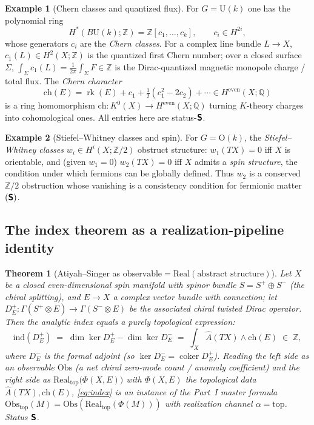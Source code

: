 \documentclass[12pt]{article}
\newtheorem{theorem}{Theorem}[section]
\theoremstyle{definition}
\newtheorem{example}[example]{Example}
\theoremstyle{remark}
\newcommand{\Real}{\mathrm{Real}}
\newcommand{\Obs}{\mathrm{Obs}}
\newcommand{\ind}{\mathrm{ind}}
\newcommand{\ch}{\mathrm{ch}}
\newcommand{\Ahat}{\widehat{A}}
\newcommand{\Zm}{\mathbb{Z}}
\newcommand{\Qm}{\mathbb{Q}}
\DeclareMathOperator{\rk}{rk}
\newcommand{\Sfont}{\textnormal{\sffamily\bfseries S}}
\begin{document}
\begin{example}[Chern classes and quantized flux]
\label{ex:chern}
For $G=\mathrm{U}(k)$ one has the polynomial ring
\[
  H^*(B\mathrm{U}(k);\Zm)=\Zm[c_1,\dots,c_k],\qquad c_i\in H^{2i},
\]
whose generators $c_i$ are the \emph{Chern classes}. For a complex line bundle
$L\to X$, $c_1(L)\in H^2(X;\Zm)$ is the quantized first Chern number; over a closed
surface $\Sigma$, $\int_\Sigma c_1(L)=\frac{1}{2\pi}\int_\Sigma F\in\Zm$ is the
Dirac-quantized magnetic monopole charge / total flux. The \emph{Chern character}
\[
  \ch(E)=\rk(E)+c_1+\tfrac12(c_1^2-2c_2)+\cdots\in H^{\mathrm{even}}(X;\Qm)
\]
is a ring homomorphism $\ch\colon K^0(X)\to H^{\mathrm{even}}(X;\Qm)$ turning
$K$-theory charges into cohomological ones. All entries here are status-$\Sfont$.
\end{example}

\begin{example}[Stiefel--Whitney classes and spin]
\label{ex:sw}
For $G=\mathrm{O}(k)$, the \emph{Stiefel--Whitney classes}
$w_i\in H^i(X;\Zm/2)$ obstruct structure: $w_1(TX)=0$ iff $X$ is orientable, and
(given $w_1=0$) $w_2(TX)=0$ iff $X$ admits a \emph{spin structure}, the condition
under which fermions can be globally defined. Thus $w_2$ is a conserved $\Zm/2$
obstruction whose vanishing is a consistency condition for fermionic matter
$(\Sfont)$.
\end{example}

\subsection{The index theorem as a realization-pipeline identity}

\begin{theorem}[Atiyah--Singer as $\text{observable}=\Real(\text{abstract structure})$]
\label{thm:index}
Let $X$ be a closed even-dimensional spin manifold with spinor bundle
$S=S^+\oplus S^-$ (the chiral splitting), and $E\to X$ a complex vector bundle
with connection; let $D_E^+\colon\Gamma(S^+\otimes E)\to\Gamma(S^-\otimes E)$ be
the associated chiral twisted Dirac operator. Then the analytic index equals a
purely topological expression:
\begin{equation}
\label{eq:index}
  \ind(D_E^+) \;=\; \dim\ker D_E^+ - \dim\ker D_E^-
  \;=\; \int_X \Ahat(TX)\wedge\ch(E)\;\in\;\Zm ,
\end{equation}
where $D_E^-$ is the formal adjoint (so $\ker D_E^-=\operatorname{coker}D_E^+$).
Reading the left side as an \emph{observable} $\Obs$ (a net chiral zero-mode
count / anomaly coefficient) and the right side as
$\Real_{\mathrm{top}}\bigl(\Phi(X,E)\bigr)$ with $\Phi(X,E)$ the topological data
$\Ahat(TX),\ch(E)$, \eqref{eq:index} is an instance of the Part~I master formula
$\Obs_{\mathrm{top}}(M)=\Obs(\Real_{\mathrm{top}}(\Phi(M)))$ with realization
channel $\alpha=\mathrm{top}$. Status $\Sfont$.
\end{theorem}
\end{document}
